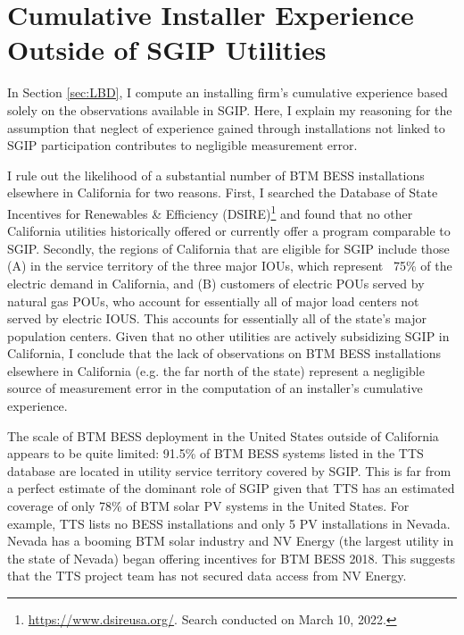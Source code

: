 \section{Cumulative Installer Experience Outside of SGIP Utilities}\label{apdx:LBD}

In Section \ref{sec:LBD}, I compute an installing firm's cumulative experience based solely on the observations available in SGIP. Here, I explain my reasoning for the assumption that neglect of experience gained through installations not linked to SGIP participation contributes to negligible measurement error.

I rule out the likelihood of a substantial number of BTM BESS installations elsewhere in California for two reasons. First, I searched the Database of State Incentives for Renewables \& Efficiency (DSIRE)\footnote{\url{https://www.dsireusa.org/}. Search conducted on March 10\Xth, 2022.} and found that no other California utilities historically offered or currently offer a program comparable to SGIP. Secondly, the regions of California that are eligible for SGIP include those (A) in the service territory of the three major IOUs, which represent ~75\% of the electric demand in California, and (B) customers of electric POUs served by natural gas POUs, who account for essentially all of major load centers not served by electric IOUS. This accounts for essentially all of the state's major population centers. Given that no other utilities are actively subsidizing SGIP in California, I conclude that the lack of observations on BTM BESS installations elsewhere in California (e.g. the far north of the state) represent a negligible source of measurement error in the computation of an installer's cumulative experience.

The scale of BTM BESS deployment in the United States outside of California appears to be quite limited: 91.5\% of BTM BESS systems listed in the TTS database are located in utility service territory covered by SGIP. This is far from a perfect estimate of the dominant role of SGIP given that TTS has an estimated coverage of only 78\% of BTM solar PV systems in the United States. For example, TTS lists no BESS installations and only 5 PV installations in Nevada. Nevada has a booming BTM solar industry and NV Energy (the largest utility in the state of Nevada) began offering incentives for BTM BESS 2018. This suggests that the TTS project team has not secured data access from NV Energy.

